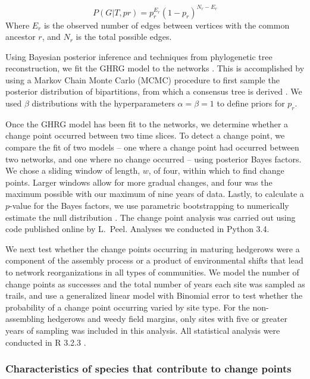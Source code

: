 \documentclass[12pt]{article}
\begin{document}
\begin{equation}
  \label{eq:lik}
  P(G|T,{pr}) = p_r^{E_r}(1-p_r)^{N_r-E_r}
\end{equation}
% 
Where $E_r$ is the observed number of edges between vertices with the
common ancestor $r$, and $N_r$ is the total possible edges.

Using Bayesian posterior inference and techniques from phylogenetic
tree reconstruction, we fit the GHRG model to the networks
\citep{peel2014detecting}. This is accomplished by using a Markov
Chain Monte Carlo (MCMC) procedure to first sample the posterior
distribution of bipartitions, from which a consensus tree is derived
\citep{peel2014detecting}. We used $\beta$ distributions with the
hyperparameters $\alpha=\beta=1$ to define priors for $p_r$.

Once the GHRG model has been fit to the networks, we determine whether
a change point occurred between two time slices. To detect a change
point, we compare the fit of two models -- one where a change point
had occurred between two networks, and one where no change occurred --
using posterior Bayes factors. We chose a sliding window of length,
$w$, of four, within which to find change points. Larger windows allow
for more gradual changes, and four was the maximum possible with our
maximum of nine years of data. Lastly, to calculate a $p$-value for
the Bayes factors, we use parametric bootstrapping to numerically
estimate the null distribution \citep{peel2014detecting}. The change
point analysis was carried out using code published online by
L.~Peel. Analyses we conducted in Python 3.4.

We next test whether the change points occurring in maturing hedgerows
were a component of the assembly process or a product of environmental
shifts that lead to network reorganizations in all types of
communities. We model the number of change points as successes and the
total number of years each site was sampled as trails, and use a
generalized linear model with Binomial error to test whether the
probability of a change point occurring varied by site type. For the
non-assembling hedgerows and weedy field margins, only sites with five
or greater years of sampling was included in this analysis. All
statistical analysis were conducted in R 3.2.3 \citep{R}.

\subsubsection*{Characteristics of species that contribute to change
  points}
\end{document}
